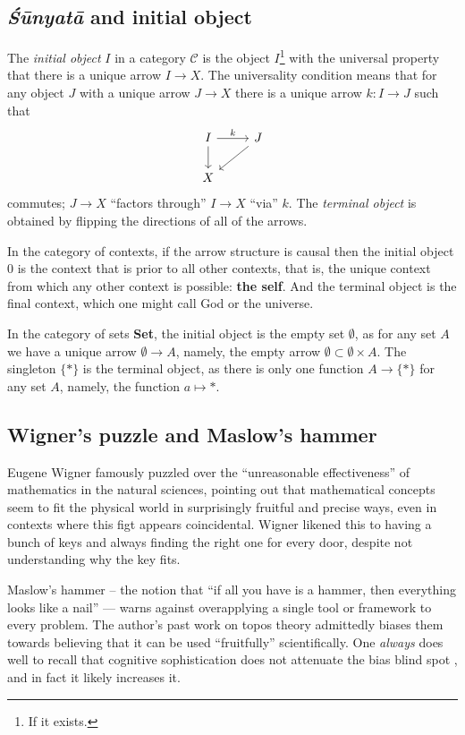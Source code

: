 \documentclass{article}
\begin{document}
\subsection{\emph{Śūnyatā} and initial object}
The \emph{initial object} $I$ in a category $\mathcal{C}$ is the object $I$\footnote{If it exists.} with the universal property that there is a unique arrow $I \to X$. The universality condition means that for any object $J$ with a unique arrow $J \to X$ there is a unique arrow $k \colon I \to J$ such that
\[
    \begin{tikzcd}
        I \arrow[r, "k"] \arrow[d] & J \arrow[ld] \\
        X
    \end{tikzcd}
\]
commutes; $J \to X$ ``factors through'' $I \to X$ ``via'' $k$. The \emph{terminal object} is obtained by flipping the directions of all of the arrows.

In the category of contexts, if the arrow structure is causal then the initial object $0$ is the context that is prior to all other contexts, that is, the unique context from which any other context is possible: \textbf{the self}. And the terminal object is the final context, which one might call God or the universe.

In the category of sets \textbf{Set}, the initial object is the empty set $\emptyset$, as for any set $A$ we have a unique arrow $\emptyset \to A$, namely, the empty arrow $\emptyset \subset \emptyset \times A$. The singleton $\{ * \}$ is the terminal object, as there is only one function $A \to \{ * \}$ for any set $A$, namely, the function $a \mapsto *$.

\subsection{Wigner's puzzle and Maslow's hammer}
Eugene Wigner famously puzzled over the ``unreasonable effectiveness'' of mathematics in the natural sciences, pointing out that mathematical concepts seem to fit the physical world in surprisingly fruitful and precise ways, even in contexts where this figt appears coincidental. Wigner likened this to having a bunch of keys and always finding the right one for every door, despite not understanding why the key fits.

Maslow's hammer -- the notion that ``if all you have is a hammer, then everything looks like a nail'' --- warns against overapplying a single tool or framework to every problem. The author's past work \cite{mahany2012} on topos theory admittedly biases them towards believing that it can be used ``fruitfully'' scientifically. One \emph{always} does well to recall that cognitive sophistication does not attenuate the bias blind spot \cite{west2012}, and in fact it likely increases it.
\end{document}
